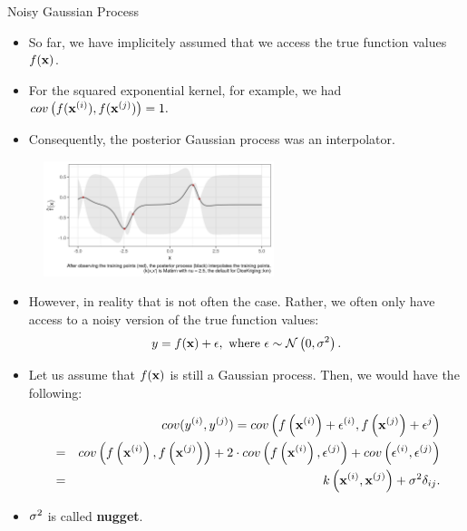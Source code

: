 \begin{frame}[c,allowframebreaks]{Noisy Gaussian Process}

\begin{itemize}
\item So far, we have implicitely assumed that we access the true function values $f(\mathbf{x})$.
\vspace{3mm}
\item For the squared exponential kernel, for example, we had
  $cov\left(f(\mathbf{x}^{(i)}), f(\mathbf{x}^{(j)})\right) = 1.$
\vspace{3mm}
\item Consequently, the posterior Gaussian process was an interpolator.
\end{itemize}

\begin{figure}
\includegraphics[width=0.6\textwidth]{figure_man/gp-interpolator.png}\par
\end{figure}

\framebreak

\begin{itemize}

\item However, in reality that is not often the case. Rather, we often only have access to a noisy version of the true function values:
  $$y = f(\mathbf{x}) + \epsilon, \text{ where } \epsilon \sim\mathcal{N}\left(0, \sigma^2\right).$$
  
\item Let us assume that $f(\mathbf{x})$ is still a Gaussian process. Then, we would have the following:
  \begin{footnotesize} 
  \begin{eqnarray*}
    &&cov(y^{(i)}, y^{(j)}) = cov\left(f\left(\mathbf{x}^{(i)}\right) + \epsilon^{(i)}, f\left(\mathbf{x}^{(j)}\right) + \epsilon^{j}\right) \\
    &=& cov\left(f\left(\mathbf{x}^{(i)}\right), f\left(\mathbf{x}^{(j)}\right)\right) + 2 \cdot cov\left(f\left(\mathbf{x}^{(i)}\right), \epsilon^{(j)}\right) + cov\left(\epsilon^{(i)}, \epsilon^{(j)}\right) 
    \\ &=& k\left(\mathbf{x}^{(i)}, \mathbf{x}^{(j)}\right) + \sigma^2 \delta_{ij}. 
  \end{eqnarray*}
  \end{footnotesize}
  \item[\faLightbulbO] $\sigma^2$ is called \textbf{nugget}. 
\end{itemize}


\end{frame}
